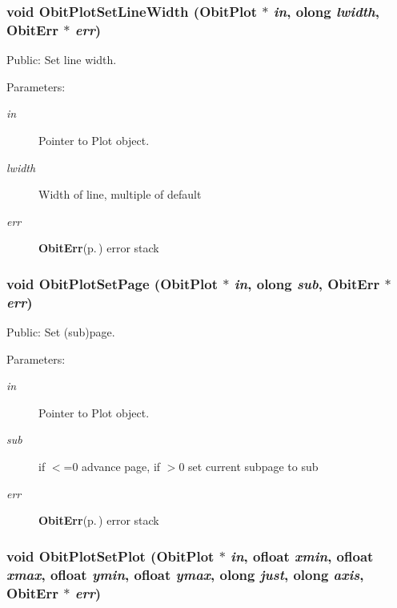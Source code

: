 \subsubsection{\setlength{\rightskip}{0pt plus 5cm}void Obit\-Plot\-Set\-Line\-Width ({\bf Obit\-Plot} $\ast$ {\em in}, {\bf olong} {\em lwidth}, {\bf Obit\-Err} $\ast$ {\em err})}\label{ObitPlot_8c_a21}


Public: Set line width. 

\begin{Desc}
\item[Parameters:]
\begin{description}
\item[{\em in}]Pointer to Plot object. \item[{\em lwidth}]Width of line, multiple of default \item[{\em err}]{\bf Obit\-Err}{\rm (p.\,\pageref{structObitErr})} error stack \end{description}
\end{Desc}
\subsubsection{\setlength{\rightskip}{0pt plus 5cm}void Obit\-Plot\-Set\-Page ({\bf Obit\-Plot} $\ast$ {\em in}, {\bf olong} {\em sub}, {\bf Obit\-Err} $\ast$ {\em err})}\label{ObitPlot_8c_a24}


Public: Set (sub)page. 

\begin{Desc}
\item[Parameters:]
\begin{description}
\item[{\em in}]Pointer to Plot object. \item[{\em sub}]if $<$=0 advance page, if $>$0 set current subpage to sub \item[{\em err}]{\bf Obit\-Err}{\rm (p.\,\pageref{structObitErr})} error stack \end{description}
\end{Desc}
\subsubsection{\setlength{\rightskip}{0pt plus 5cm}void Obit\-Plot\-Set\-Plot ({\bf Obit\-Plot} $\ast$ {\em in}, {\bf ofloat} {\em xmin}, {\bf ofloat} {\em xmax}, {\bf ofloat} {\em ymin}, {\bf ofloat} {\em ymax}, {\bf olong} {\em just}, {\bf olong} {\em axis}, {\bf Obit\-Err} $\ast$ {\em err})}\label{ObitPlot_8c_a17}


